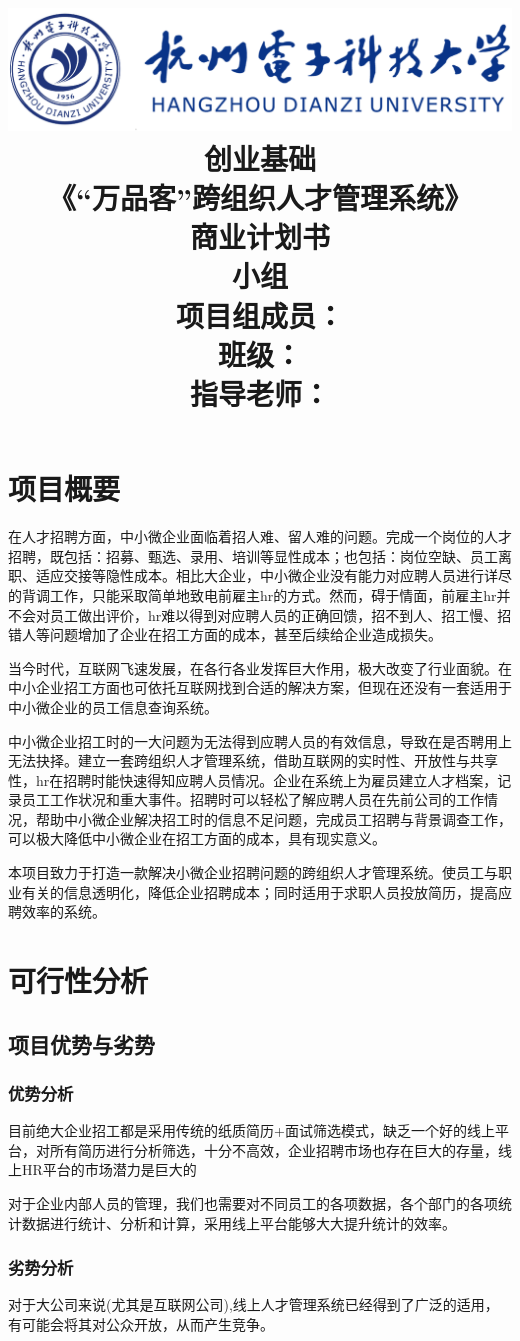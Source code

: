 \documentclass[UTF8]{ctexart}
\title{
	\includegraphics[scale = 0.8]{HDU.png}\\
    \vspace{1in}
    \textmd{ \Huge\textbf{创业基础}}\\
    \textmd{\textbf{《“万品客”跨组织人才管理系统》}}\\
    \textmd{\textbf{商业计划书}}\\
   	\vspace{3in}
   	\large{小组 \qquad}\\
	\textmd{项目组成员：\qquad}\\
	\textmd{班级：\qquad}\\
	\textmd{指导老师：\qquad}\\
}
\begin{document}
\maketitle
\newpage
\tableofcontents
\newpage
\section{项目概要}
在人才招聘方面，中小微企业面临着招人难、留人难的问题。完成一个岗位的人才招聘，既包括：招募、甄选、录用、培训等显性成本；也包括：岗位空缺、员工离职、适应交接等隐性成本。相比大企业，中小微企业没有能力对应聘人员进行详尽的背调工作，只能采取简单地致电前雇主hr的方式。然而，碍于情面，前雇主hr并不会对员工做出评价，hr难以得到对应聘人员的正确回馈，招不到人、招工慢、招错人等问题增加了企业在招工方面的成本，甚至后续给企业造成损失。

当今时代，互联网飞速发展，在各行各业发挥巨大作用，极大改变了行业面貌。在中小企业招工方面也可依托互联网找到合适的解决方案，但现在还没有一套适用于中小微企业的员工信息查询系统。

中小微企业招工时的一大问题为无法得到应聘人员的有效信息，导致在是否聘用上无法抉择。建立一套跨组织人才管理系统，借助互联网的实时性、开放性与共享性，hr在招聘时能快速得知应聘人员情况。企业在系统上为雇员建立人才档案，记录员工工作状况和重大事件。招聘时可以轻松了解应聘人员在先前公司的工作情况，帮助中小微企业解决招工时的信息不足问题，完成员工招聘与背景调查工作，可以极大降低中小微企业在招工方面的成本，具有现实意义。

本项目致力于打造一款解决小微企业招聘问题的跨组织人才管理系统。使员工与职业有关的信息透明化，降低企业招聘成本；同时适用于求职人员投放简历，提高应聘效率的系统。
\section{可行性分析}
\subsection{项目优势与劣势}
\subsubsection{优势分析}
目前绝大企业招工都是采用传统的纸质简历+面试筛选模式，缺乏一个好的线上平台，对所有简历进行分析筛选，十分不高效，企业招聘市场也存在巨大的存量，线上HR平台的市场潜力是巨大的

对于企业内部人员的管理，我们也需要对不同员工的各项数据，各个部门的各项统计数据进行统计、分析和计算，采用线上平台能够大大提升统计的效率。
\subsubsection{劣势分析}
对于大公司来说(尤其是互联网公司),线上人才管理系统已经得到了广泛的适用，有可能会将其对公众开放，从而产生竞争。
\end{document}
